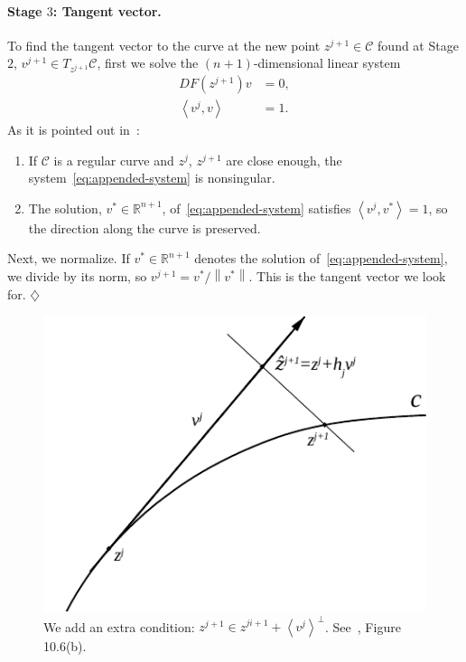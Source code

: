 \documentclass[11pt,reqno,twoside]{article}
\newcommand{\R}{\ensuremath{\mathbb{R}}}
\theoremstyle{remark}
\begin{document}
\paragraph{Stage $3$: Tangent vector.} To find the tangent vector to the
curve at the new point $z^{j+1}\in\mathcal{C}$ found at Stage
$2$, $v^{j+1}\in  T_{z^{j+1}}\mathcal{C}$, first we solve the
$(n+1)$-dimensional linear system
    \begin{equation}\label{eq:appended-system}
      \begin{split}
      DF\left(z^{j+1}\right)v &= 0,\\
      \left\langle v^{j}, v \right\rangle &= 1.
    \end{split}
  \end{equation}
  As it is pointed out in~\cite{Kuznetsov2004}:
  \begin{enumerate}[label = \emph{(\roman*)}]
    \item If $\mathcal{C}$ is a regular curve and $z^{j}$, $z^{j+1}$ are close
  enough, the system~\eqref{eq:appended-system} is nonsingular.
    \item The solution, $v^{\ast}\in\R^{n+1}$,
  of~\eqref{eq:appended-system} satisfies $\left\langle v^{j},
  v^{\ast}\right\rangle = 1$, so the direction along the curve is
  preserved.
\end{enumerate}
Next, we normalize. If $v^{\ast}\in\R^{n+1}$ denotes the solution
of~\eqref{eq:appended-system}, we divide by its norm, so $v^{j+1} =
v^{\ast}/\left\|v^{\ast}\right\|$. This is the tangent vector we look for.
\hfill $\diamondsuit$

\begin{figure}[!t]
  \centering
  \includegraphics[scale=1.0]{arcstep}
  \caption{We add an extra condition: $z^{j+1}\in
  \hat{z}^{ji+1} + \left\langle v^{j}\right\rangle^{\perp}$.
See~\cite{Kuznetsov2004}, Figure 10.6(b).\label{fig:pseudo-arc}}
\end{figure}
\end{document}
